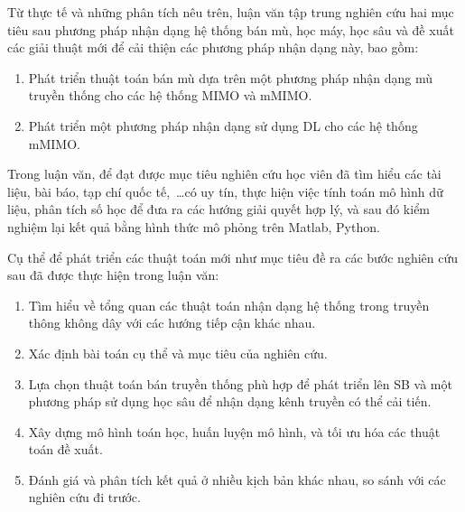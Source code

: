 Từ thực tế và những phân tích nêu trên, luận văn tập trung nghiên cứu hai mục tiêu sau phương pháp nhận dạng hệ thống bán mù, học máy, học sâu và đề xuất các giải thuật mới để cải thiện các phương pháp nhận dạng này, bao gồm:
\begin{enumerate}
    \item Phát triển thuật toán bán mù dựa trên một phương pháp nhận dạng mù truyền thống cho các hệ thống MIMO và mMIMO.
    
    \item Phát triển một phương pháp nhận dạng sử dụng DL cho các hệ thống mMIMO.
\end{enumerate}
\vspace{0.5cm}


Trong luận văn, để đạt được mục tiêu nghiên cứu học viên đã tìm hiểu các tài liệu, bài báo, tạp chí quốc tế,~\ldots có uy tín, thực hiện việc tính toán mô hình dữ liệu, phân tích số học để đưa ra các hướng giải quyết hợp lý, và sau đó kiểm nghiệm lại kết quả bằng hình thức mô phỏng trên Matlab, Python.

Cụ thể để phát triển các thuật toán mới như mục tiêu đề ra các bước nghiên cứu sau đã được thực hiện trong luận văn:

\begin{enumerate}
    \item Tìm hiểu về tổng quan các thuật toán nhận dạng hệ thống trong truyền thông không dây với các hướng tiếp cận khác nhau. 
	\item Xác định bài toán cụ thể và mục tiêu của nghiên cứu.
	\item Lựa chọn thuật toán bán truyền thống phù hợp để phát triển lên SB và một phương pháp sử dụng học sâu để nhận dạng kênh truyền có thể cải tiến.
	\item Xây dựng mô hình toán học, huấn luyện mô hình, và tối ưu hóa các thuật toán đề xuất.
	\item Đánh giá và phân tích kết quả ở nhiều kịch bản khác nhau, so sánh với các nghiên cứu đi trước.
\end{enumerate} 
\vspace{0.3cm}


